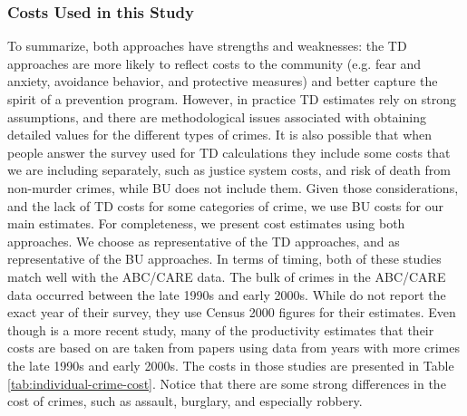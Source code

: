 \subsubsection{Costs Used in this Study}
\noindent To summarize, both approaches have strengths and weaknesses: the TD approaches are more likely to reflect costs to the community (e.g. fear and anxiety, avoidance behavior, and protective measures) and better capture the spirit of a prevention program. However, in practice TD estimates rely on strong assumptions, and there are methodological issues associated with obtaining detailed values for the different types of crimes. It is also possible that when people answer the survey used for TD calculations they include some costs that we are including separately, such as justice system costs, and risk of death from non-murder crimes, while BU does not include them. Given those considerations, and the lack of TD costs for some categories of crime, we use BU costs for our main estimates. For completeness, we present cost estimates using both approaches. We choose \cite{Cohen_Rust_etal_2004_Criminology} as representative of the TD approaches, and \cite{McCollister_etal_2010_DAD} as representative of the BU approaches. In terms of timing, both of these studies match well with the ABC/CARE data. The bulk of crimes in the ABC/CARE data occurred between the late 1990s and early 2000s. While \cite{Cohen_Rust_etal_2004_Criminology} do not report the exact year of their survey, they use Census 2000 figures for their estimates. Even though \cite{McCollister_etal_2010_DAD} is a more recent study, many of the productivity estimates that their costs are based on are taken from papers using data from years with more crimes the late 1990s and early 2000s. The costs in those studies are presented in Table \ref{tab:individual-crime-cost}. Notice that there are some strong differences in the cost of crimes, such as assault, burglary, and especially robbery. 


